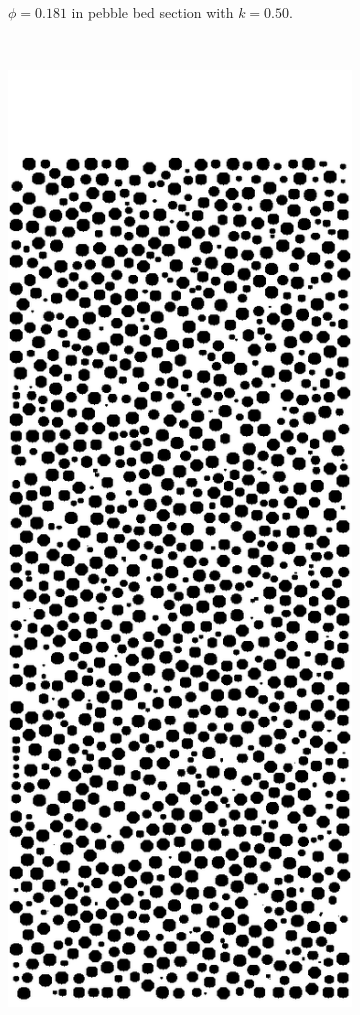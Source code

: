 \begin{figure}[h]
\begin{subfigure}[b]{0.2\textwidth}
                \caption{$\phi = 0.181$ in pebble bed section with $k = 0.50$.}
                \label{fig:2d-res20-k050}
        \end{subfigure}%
        ~
        \begin{subfigure}[b]{0.2\textwidth}
                \includegraphics[width=\textwidth]{figures/lbm/2d-res20-k075.png}

\end{subfigure}
\end{figure}
